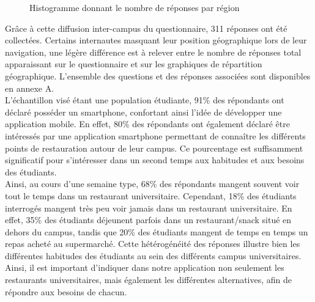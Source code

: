 \begin{figure}[H]
    \label{fig-histo-reponses}
    \noindent{}
    \caption{Histogramme donnant le nombre de réponses par région}
\end{figure}

Grâce à cette diffusion inter-campus du questionnaire, 311 réponses ont été collectées. Certains internautes masquant leur position géographique lors de leur navigation, une légère différence est à relever entre le nombre de réponses total apparaissant sur le questionnaire et sur les graphiques de répartition géographique. L'ensemble des questions et des réponses associées sont disponibles en annexe A. \\

L'échantillon visé étant une population étudiante, 91\% des répondants ont déclaré posséder un smartphone, confortant ainsi l'idée de développer une application mobile. En effet, 80\% des répondants ont également déclaré être intéressés par une application smartphone permettant de connaître les différents points de restauration autour de leur campus. Ce pourcentage est suffisamment significatif pour s'intéresser dans un second temps aux habitudes et aux besoins des étudiants. \\

Ainsi, au cours d'une semaine type, 68\% des répondants mangent souvent voir tout le temps dans un restaurant universitaire. Cependant, 18\% des étudiants interrogés mangent très peu voir jamais dans un restaurant universitaire. En effet, 35\% des étudiants déjeunent parfois dans un restaurant/snack situé en dehors du campus, tandis que 20\% des étudiants mangent de temps en temps un repas acheté au supermarché. Cette hétérogénéité des réponses illustre bien les différentes habitudes des étudiants au sein des différents campus universitaires. Ainsi, il est important d'indiquer dans notre application non seulement les restaurants universitaires, mais également les différentes alternatives, afin de répondre aux besoins de chacun. \\

